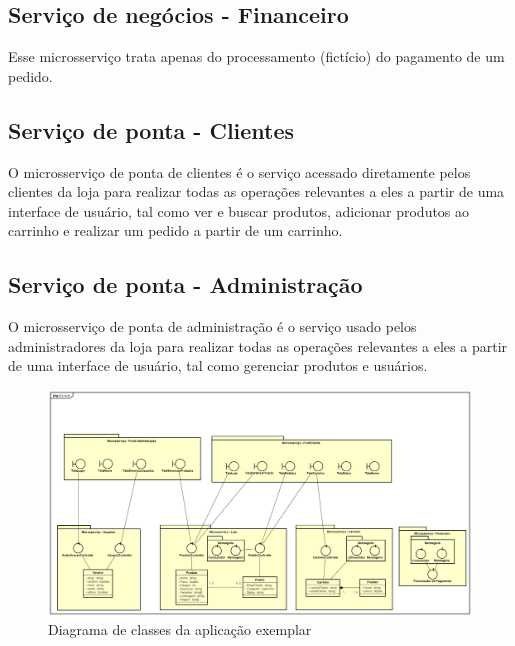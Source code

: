 \subsection*{Serviço de negócios - Financeiro}
Esse microsserviço trata apenas do processamento (fictício) do pagamento de um pedido.

\subsection*{Serviço de ponta - Clientes}
O microsserviço de ponta de clientes é o serviço acessado diretamente pelos clientes da loja para realizar todas as operações relevantes a eles a partir de uma interface de usuário, tal como ver e buscar produtos, adicionar produtos ao carrinho e realizar um pedido a partir de um carrinho.

\subsection*{Serviço de ponta - Administração}
O microsserviço de ponta de administração é o serviço usado pelos administradores da loja para realizar todas as operações relevantes a eles a partir de uma interface de usuário, tal como gerenciar produtos e usuários.


\begin{figure}[htb]
	\caption{\label{figura-diagrama-de-classes}Diagrama de classes da aplicação exemplar}
	\begin{center}
	    \includegraphics[scale=0.25]{Diagramas/imagens/ClassesComFinanceiro.png}
	\end{center}
\end{figure}

